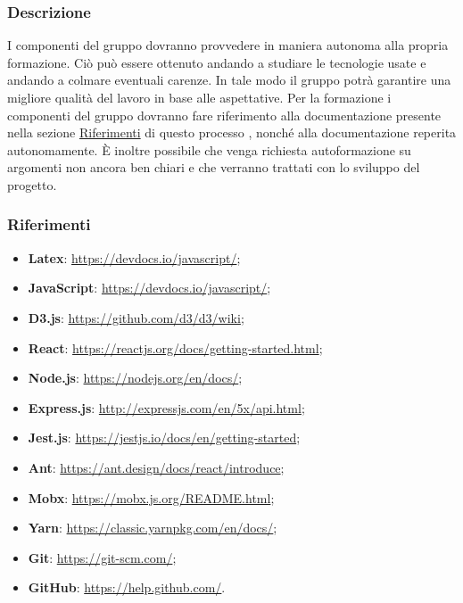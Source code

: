 			\subsubsection{Descrizione}
			I componenti del gruppo dovranno provvedere in maniera autonoma alla propria formazione. Ciò può essere ottenuto andando a studiare le tecnologie usate e andando a colmare eventuali carenze. In tale modo il gruppo potrà garantire una migliore qualità del lavoro in base alle aspettative. Per la formazione i componenti del gruppo dovranno fare riferimento alla documentazione presente nella sezione \hyperref[sec:Riferimenti]{Riferimenti} di questo processo , nonché alla documentazione reperita autonomamente.
			È inoltre possibile che venga richiesta autoformazione su argomenti non ancora ben chiari e che verranno trattati con lo sviluppo del progetto.	
			
			\subsubsection{Riferimenti} \label{sec:Riferimenti}
				\begin{itemize}
					\item \textbf{Latex}: \url{https://devdocs.io/javascript/};
					\item \textbf{JavaScript}: \url{https://devdocs.io/javascript/};
					\item \textbf{D3.js}: \url{https://github.com/d3/d3/wiki};
					\item \textbf{React}: \url{https://reactjs.org/docs/getting-started.html};
					\item \textbf{Node.js}: \url{https://nodejs.org/en/docs/};
					\item \textbf{Express.js}: \url{http://expressjs.com/en/5x/api.html};
					\item \textbf{Jest.js}: \url{https://jestjs.io/docs/en/getting-started};
					\item \textbf{Ant}: \url{https://ant.design/docs/react/introduce};
					\item \textbf{Mobx}: \url{https://mobx.js.org/README.html};
					\item \textbf{Yarn}: \url{https://classic.yarnpkg.com/en/docs/};
					\item \textbf{Git}: \url{https://git-scm.com/};
					\item \textbf{GitHub}: \url{https://help.github.com/}.
				\end{itemize}
		
